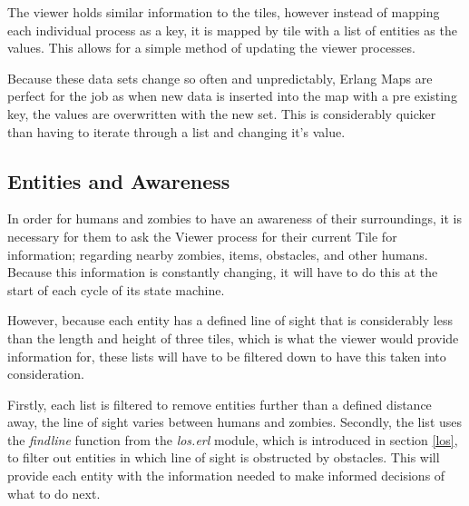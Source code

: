 The viewer holds similar information to the tiles, however instead of mapping each individual process as a key, it is mapped by tile with a list of entities as the values. This allows for a simple method of updating the viewer processes.

Because these data sets change so often and unpredictably, Erlang Maps are perfect for the job as when new data is inserted into the map with a pre existing key, the values are overwritten with the new set. This is considerably quicker than having to iterate through a list and changing it's value.

\subsection{Entities and Awareness}
\label{entities_awareness}
\label{viewer_intro}
In order for humans and zombies to have an awareness of their surroundings, it is necessary for them to ask the Viewer process for their current Tile for information; regarding nearby zombies, items, obstacles, and other humans. Because this information is constantly changing, it will have to do this at the start of each cycle of its state machine.

However, because each entity has a defined line of sight that is considerably less than the length and height of three tiles, which is what the viewer would provide information for, these lists will have to be filtered down to have this taken into consideration.

Firstly, each list is filtered to remove entities further than a defined distance away, the line of sight varies between humans and zombies. Secondly, the list uses the \emph{findline} function from the \emph{los.erl} module, which is introduced in section \ref{los}, to filter out entities in which line of sight is obstructed by obstacles. This will provide each entity with the information needed to make informed decisions of what to do next.

